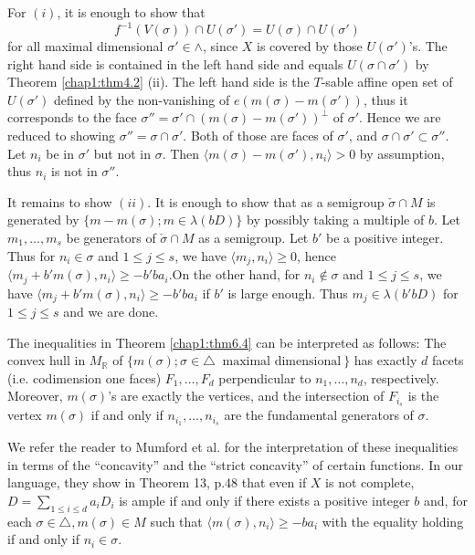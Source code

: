 For $(i)$, it is enough to show that 
$$
f^{-1}(V(\sigma)) \cap U(\sigma') = U(\sigma) \cap U(\sigma') 
$$
for all maximal dimensional $\sigma' \in \wedge$, since $X$ is
covered by those $U(\sigma')$'s. The right hand side is contained in
the left hand side and equals $U(\sigma \cap \sigma')$ by Theorem
\ref{chap1:thm4.2} (ii). The left hand side is the $T$-sable affine open set of
$U(\sigma')$ defined by the non-vanishing of $e(m (\sigma) -
m(\sigma'))$, thus it corresponds to the face $\sigma'' = \sigma' \cap
(m (\sigma) - m (\sigma'))^{\perp}$ of $\sigma'$. Hence we are reduced
to showing $\sigma'' = \sigma \cap \sigma'$. Both of those are faces of
$\sigma'$, and $\sigma \cap \sigma' \subset \sigma''$. Let $n_{i}$ be
in $\sigma'$ but not in $\sigma$. Then $\langle m (\sigma) -
m(\sigma'), n_{i}\rangle > 0$ by assumption, thus $n_{i}$ is not in
$\sigma''$.  

	It remains to show $(ii)$. It is enough to show that as a
        semigroup $\check{\sigma} \cap M$ is generated by $\{ m - m
        (\sigma) ; m \in \lambda (bD)\}$ by possibly taking a multiple
        of $b$. Let $m_{1}, \ldots, m_{s}$ be generators of
        $\check{\sigma}\cap M$ as a semigroup. Let $b'$ be a positive
        integer. Thus for $n_{i}\in \sigma$ and $1 \leq j \leq s$, we
        have $\langle m_{j}, n_{i} \rangle \geq 0 $, hence $\langle
        m_{j} + b' m(\sigma), n_{i} \rangle \geq - b'
        ba_{i}$.\pageoriginale On the 
        other hand, for $n_{i} \notin \sigma$ and $1 \leq j \leq s$,
        we have $ \langle m_{j} + b' m(\sigma), n_{i} \rangle \geq - b' ba_{i}$ if
        $b'$ is large enough. Thus $m_{j} \in \lambda (b'bD)$ for $1
        \leq j \leq s$ and we are done. 

\begin{remark*}
The inequalities in Theorem \ref{chap1:thm6.4} can be interpreted as follows: The
convex hull in $M_{\mathbb{R}}$ of $\{m (\sigma) ;\sigma \in
\triangle~ \text{ maximal dimensional}~\}$ has exactly $d$ facets
(i.e. codimension one faces) $F_{1}, \ldots, F_{d}$ perpendicular to
$n_{1}, \ldots , n_{d}$, respectively. Moreover, $m(\sigma)$'s are
exactly the vertices, and the intersection of $F_{i_{s}}$ is the
vertex $m(\sigma)$ if and only if $n_{i_{1}}, \ldots , n_{i_{s}}$ are
the fundamental generators of $\sigma$.  
\end{remark*}

\begin{remark*}
We refer the reader to Mumford et al. \cite{keyTE} for the interpretation of
these inequalities in terms of the ``concavity'' and the ``strict
concavity'' of certain functions. In our language, they show in Theorem
13, p.48 that even if $X$ is not complete, $D =\sum\limits_{1 \leq i
  \leq d} a_{i}D_{i}$ is ample if and only if there exists a positive
integer $b$ and, for each $\sigma \in \triangle, m (\sigma) \in M$
such that $\langle m (\sigma), n_{i} \rangle \geq - ba_{i}$ with the equality
holding if and only if $n_{i} \in \sigma$.  
\end{remark*}

